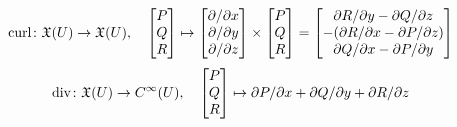 \begin{frame}
  \begin{displaymath}
    \operatorname{curl} \colon \mathfrak{X}(U) \to \mathfrak{X}(U), \quad
    \begin{bmatrix}
      P \\ Q \\ R
    \end{bmatrix}
    \mapsto
    \begin{bmatrix}
      {\partial} / {\partial x} \\
      {\partial} / {\partial y} \\
      {\partial} / {\partial z} \\
    \end{bmatrix}
    \times
    \begin{bmatrix}
      P \\ Q \\ R
    \end{bmatrix}
    =
    \begin{bmatrix}
      \partial R / \partial y - \partial Q / \partial z \\
      -(\partial R / \partial x - \partial P / \partial z) \\
      \partial Q / \partial x - \partial P / \partial y
    \end{bmatrix}
  \end{displaymath}
  \begin{displaymath}
    \operatorname{div} \colon \mathfrak{X}(U) \to C^{\infty}(U), \quad
    \begin{bmatrix}
      P \\ Q \\ R
    \end{bmatrix}
    \mapsto 
    \partial P / \partial x
    +
    \partial Q / \partial y
    +
    \partial R / \partial z
  \end{displaymath}
\end{frame}
